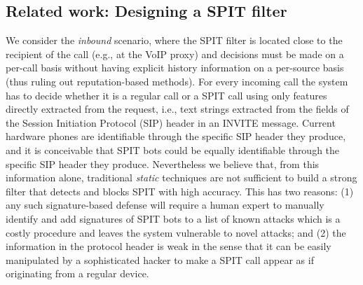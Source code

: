 \documentclass{llncs}
\begin{document}
 
\subsection{Related work: Designing a SPIT filter}
We consider the {\em inbound} scenario, where the SPIT filter is located close to the recipient of the call 
(e.g., at the VoIP proxy) and decisions must be made on a per-call basis without having explicit history information 
on a per-source basis (thus ruling out reputation-based methods). For every incoming
call the system has to decide whether it is a regular call or a SPIT call using only features directly extracted 
from the request, i.e., text strings extracted from the fields of the Session Initiation Protocol (SIP) 
header in an INVITE message.
Current hardware phones are identifiable through the specific SIP header they produce,
and it is conceivable that SPIT bots could be equally identifiable through the specific SIP header they produce.
Nevertheless we believe that, from this information alone, traditional {\em static} techniques are not sufficient to build a 
strong filter that detects and blocks SPIT with high accuracy. This has two reasons: (1) any such signature-based
defense will require a human expert to manually identify and add signatures of SPIT bots to a list of known attacks
which is a costly procedure and leaves the system vulnerable to novel attacks; and (2) the information in the 
protocol header is weak in the sense that it can be easily manipulated by a sophisticated hacker to make a 
SPIT call appear as if originating from a regular device.
\end{document}
